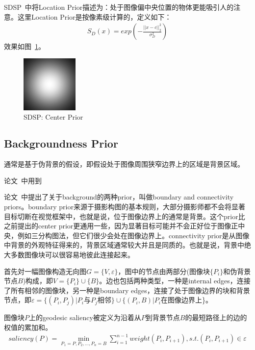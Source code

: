 \documentclass[12pt]{article}
\begin{document}
SDSP~\cite{zhang2013sdsp}中将Location Prior描述为：处于图像偏中央位置的物体更能吸引人的注意。这里Location Prior是按像素级计算的，定义如下：
\begin{align}
S_D(x) = exp\left(-\frac{||x-c||_2^2}{\sigma_D^2}\right)
\end{align}
效果如图~\ref{fig: SDSPCenterPrior}。
\begin{figure}[!ht]
\centering
\includegraphics[width=0.25\textwidth]{SDSPCenterPrior.png}
\caption{SDSP: Center Prior}
\label{fig: SDSPCenterPrior}
\end{figure} 

\subsection{Backgroundness Prior}

通常是基于伪背景的假设，即假设处于图像周围狭窄边界上的区域是背景区域。

论文~\cite{lu2014learning}中用到

论文~\cite{wei2012geodesic}中提出了关于background的两种prior，叫做boundary and connectivity priors。boundary prior来源于摄影构图的基本规则，大部分摄影师都不会将显著目标切断在视觉框架中，也就是说，位于图像边界上的通常是背景。这个prior比之前提出的center prior更通用一些，因为显著目标可能并不会正好位于图像正中央，例如三分构图法，但它们很少会处在图像边界上。connectivity prior是从图像中背景的外观特征得来的，背景区域通常较大并且是同质的。也就是说，背景中绝大多数图像块可以很容易地彼此连接起来。

首先対一幅图像构造无向图$G = \{V, \varepsilon \}$，图中的节点由两部分(图像块$\{P_i\}$和伪背景节点$B$)构成，即$V = \{P_i\}\cup \{B\}$。边也包括两种类型，一种是internal edges，连接了所有相邻的图像块，另一种是boundary edges，连接了处于图像边界的块和背景节点，即$\varepsilon = \{(P_i, P_j)|$$P_i$与$P_j$相邻$\} \cup \{(P_i, B)|$$P_i$在图像边界上\}。

图像块$P$上的geodesic saliency被定义为沿着从$P$到背景节点$B$的最短路径上的边的权值的累加和。
\begin{align}
saliency(P) = \min_{P_1=P, P_2, \ldots, P_n=B}\sum_{i=1}^{n-1}weight(P_i, P_{i+1}), s.t.(P_i, P_{i+1})\in \varepsilon
\end{align}
\end{document}
